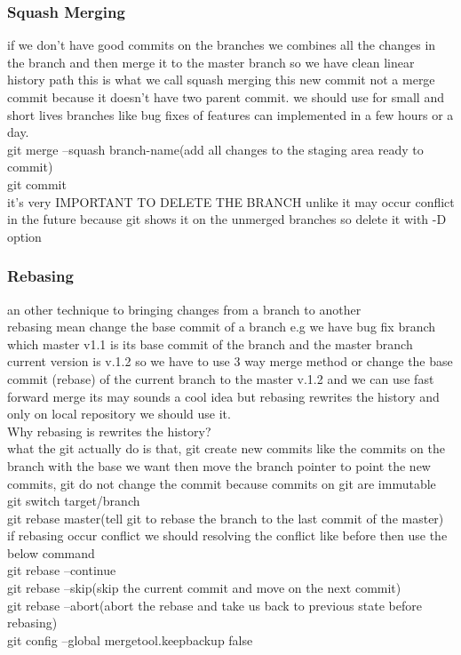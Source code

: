 \documentclass{article}
\begin{document}
		\subsubsection{Squash Merging}
			if we don't have good commits on the branches we combines all the changes in the branch and then merge it to the master branch 
			so we have clean linear history path this is what we call squash merging this new commit not a merge commit because it doesn't have two parent commit. we should use for small and short lives branches like bug fixes of features can implemented in a few hours or a day.\\
			git merge --squash branch-name(add all changes to the staging area ready to commit)\\
			git commit\\
			it's very IMPORTANT TO DELETE THE BRANCH unlike it may occur conflict in the future because git shows it on the unmerged branches so delete it with -D option
			
		\subsubsection{Rebasing}	
			an other technique to bringing changes from a branch to another\\
			rebasing mean change the base commit of a branch e.g we have bug fix branch which master v1.1 is its base commit of the branch and the master branch current version is v.1.2 so we have to use 3 way merge method or change the base commit (rebase) of the current branch to the master v.1.2 and we can use fast forward merge its may sounds a cool idea but rebasing rewrites the history and only on local repository we should use it.\\
			
			Why rebasing is rewrites the history?\\
				what the git actually do is that, git create new commits like the commits on the branch with the base we want then move the branch pointer to point the new commits, git do not change the commit because commits on git are immutable\\
			
			git switch target/branch\\
			git rebase master(tell git to rebase the branch to the last commit of the master)\\
			if rebasing occur conflict we should resolving the conflict like before then use the below command \\
			git rebase --continue\\
			git rebase --skip(skip the current commit and move on the next commit)\\
			git rebase --abort(abort the rebase and take us back to previous state before rebasing)\\
			git config --global mergetool.keepbackup false		
			
\end{document}
